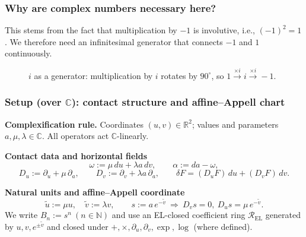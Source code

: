 \documentclass[aspectratio=169]{beamer}
\begin{document}
\begin{frame}
    \frametitle{Why are complex numbers necessary here?}
    This stems from the fact that multiplication by $-1$ is involutive, i.e., $(-1)^2=1$.
    We therefore need an infinitesimal generator that connects $-1$ and $1$ continuously.

    \vspace{0.2cm}

    \begin{figure}[ht]\centering
    \caption{$i$ as a generator: multiplication by $i$ rotates by $90^\circ$, so $1 \xrightarrow{\times i} i \xrightarrow{\times i} -1$.}
    \end{figure}
\end{frame}

\begin{frame}
  \frametitle{Setup (over $\mathbb C$): contact structure and affine--Appell chart}
  \textbf{Complexification rule.} Coordinates $(u,v)\in\mathbb R^2$; values and parameters
  $a,\mu,\lambda\in\mathbb C$. All operators act $\mathbb C$-linearly.

  \vspace{0.4em}
  \textbf{Contact data and horizontal fields}
  \[
    \omega:=\mu\,du+\lambda a\,dv,\qquad
    \alpha:=da-\omega,
  \]
  \[
    D_u:=\partial_u+\mu\,\partial_a,\qquad
    D_v:=\partial_v+\lambda a\,\partial_a,\qquad
    \delta F=(D_uF)\,du+(D_vF)\,dv.
  \]
  \vspace{0.4em}

  \textbf{Natural units and affine--Appell coordinate}
  \[
    \tilde u:=\mu u,\quad \tilde v:=\lambda v,\qquad
    s:=a\,e^{-\tilde v}\ \Rightarrow\ D_v s=0,\ D_u s=\mu\,e^{-\tilde v}.
  \]
  We write $B_n:=s^n\ (n\in\mathbb N)$ and use an EL-closed coefficient ring
  $\mathcal R_{\mathrm{EL}}$ generated by $u,v,e^{\pm\tilde v}$ and closed under
  $+,\times,\partial_u,\partial_v,\exp,\log$ (where defined).
\end{frame}
\end{document}
